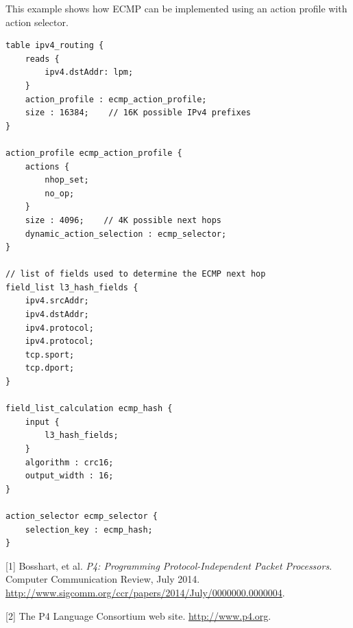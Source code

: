 \documentclass[12pt]{article}
\begin{document}

This example shows how ECMP can be implemented using an action profile with
action selector.

\begin{lstlisting}[style=P4style]
table ipv4_routing {
    reads {
        ipv4.dstAddr: lpm;
    }
    action_profile : ecmp_action_profile;
    size : 16384;    // 16K possible IPv4 prefixes
}

action_profile ecmp_action_profile {
    actions {
        nhop_set;
        no_op;
    }
    size : 4096;    // 4K possible next hops
    dynamic_action_selection : ecmp_selector;
}

// list of fields used to determine the ECMP next hop
field_list l3_hash_fields {
    ipv4.srcAddr;
    ipv4.dstAddr;
    ipv4.protocol;
    ipv4.protocol;
    tcp.sport;
    tcp.dport;
}

field_list_calculation ecmp_hash {
    input {
        l3_hash_fields;
    }
    algorithm : crc16;
    output_width : 16;
}

action_selector ecmp_selector {
    selection_key : ecmp_hash;
}
\end{lstlisting}






[1] Bosshart, et al. \textit{P4: Programming Protocol-Independent Packet Processors}. 
Computer Communication Review, July 2014.  \url{http://www.sigcomm.org/ccr/papers/2014/July/0000000.0000004}.

[2] The P4 Language Consortium web site. \url{http://www.p4.org}.
\end{document}
